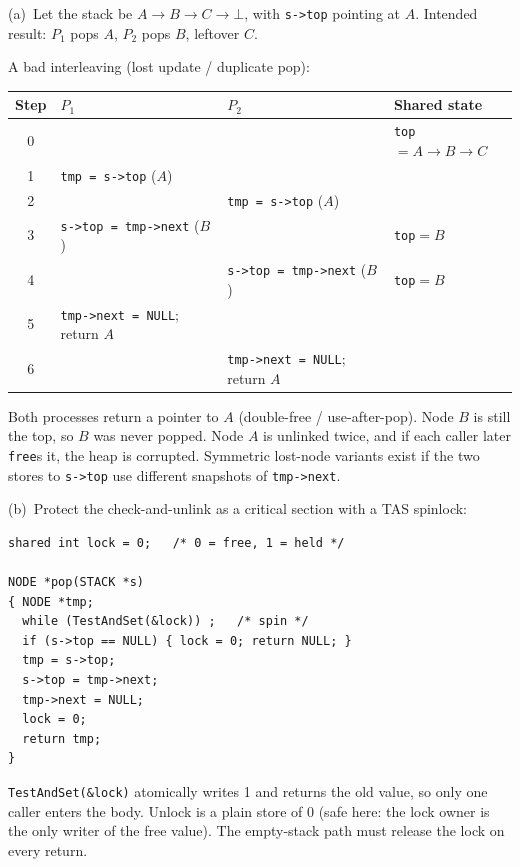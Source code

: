 \documentclass[11pt,a4paper]{article}
\newenvironment{Sol}{%
  \begin{tcolorbox}[sboxstyle, title={Solution}]%
}{%
  \end{tcolorbox}\vspace{0.35em}%
}
\begin{document}
\begin{Sol}
(a)~Let the stack be $A \to B \to C \to \bot$, with \texttt{s->top} pointing at $A$. Intended result: $P_1$ pops $A$, $P_2$ pops $B$, leftover $C$.

A bad interleaving (lost update / duplicate pop):

\begin{center}
\begin{tabular}{c|l|l|l}
Step & $P_1$ & $P_2$ & Shared state \\
\hline
0 & & & \texttt{top}$=A \to B \to C$ \\
1 & \texttt{tmp = s->top} \quad ($A$) & & \\
2 & & \texttt{tmp = s->top} \quad ($A$) & \\
3 & \texttt{s->top = tmp->next} \quad ($B$) & & \texttt{top}$=B$ \\
4 & & \texttt{s->top = tmp->next} \quad ($B$) & \texttt{top}$=B$ \\
5 & \texttt{tmp->next = NULL}; return $A$ & & \\
6 & & \texttt{tmp->next = NULL}; return $A$ & \\
\end{tabular}
\end{center}

Both processes return a pointer to $A$ (double-free / use-after-pop). Node $B$ is still the top, so $B$ was never popped. Node $A$ is unlinked twice, and if each caller later \texttt{free}s it, the heap is corrupted. Symmetric lost-node variants exist if the two stores to \texttt{s->top} use different snapshots of \texttt{tmp->next}.

(b)~Protect the check-and-unlink as a critical section with a TAS spinlock:

\begin{lstlisting}[numbers=none]
shared int lock = 0;   /* 0 = free, 1 = held */

NODE *pop(STACK *s)
{ NODE *tmp;
  while (TestAndSet(&lock)) ;   /* spin */
  if (s->top == NULL) { lock = 0; return NULL; }
  tmp = s->top;
  s->top = tmp->next;
  tmp->next = NULL;
  lock = 0;
  return tmp;
}
\end{lstlisting}

\texttt{TestAndSet(\&lock)} atomically writes 1 and returns the old value, so only one caller enters the body. Unlock is a plain store of 0 (safe here: the lock owner is the only writer of the free value). The empty-stack path must release the lock on every return.
\end{Sol}
\end{document}

